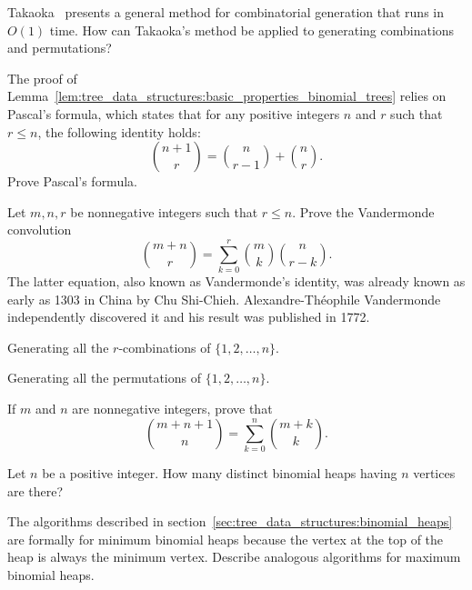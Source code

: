\begin{problem}
\item Takaoka~\cite{Takaoka1999b} presents a
  general method for combinatorial
  generation that runs in $O(1)$ time. How can Takaoka's method be
  applied to generating combinations and permutations?

\item The proof of
  Lemma~\ref{lem:tree_data_structures:basic_properties_binomial_trees}
  relies on Pascal's formula, which states that
  for any positive integers $n$ and $r$ such that $r \leq n$, the
  following identity holds:
  \[
  \binom{n+1}{r}
  =
  \binom{n}{r-1} + \binom{n}{r}.
  \]
  Prove Pascal's formula.

\item Let $m,n,r$ be nonnegative integers such that $r \leq n$. Prove
  the Vandermonde convolution
  \[
  \binom{m + n}{r}
  =
  \sum_{k=0}^r \binom{m}{k} \binom{n}{r-k}.
  \]
  The latter equation, also known as Vandermonde's identity, was
  already known as early as 1303 in China by Chu
  Shi-Chieh. Alexandre-Th\'eophile
  Vandermonde independently
  discovered it and his result was published in 1772.

\begin{algorithm}[!htbp]

\caption{Generating all the $r$-combinations of $\{1, 2, \dots, n\}$.}
\label{alg:tree_data_structures:generate_all_r_combinations}
\end{algorithm}

\begin{algorithm}[!htbp]

\caption{Generating all the permutations of $\{1, 2, \dots, n\}$.}
\label{alg:tree_data_structures:generate_all_permutations}
\end{algorithm}

\item If $m$ and $n$ are nonnegative integers, prove that
  \[
  \binom{m + n + 1}{n}
  =
  \sum_{k=0}^n \binom{m + k}{k}.
  \]

\item Let $n$ be a positive integer. How many distinct
  binomial heaps having $n$ vertices are there?

\item The algorithms described in
  section~\ref{sec:tree_data_structures:binomial_heaps} are formally
  for minimum binomial heaps because the
  vertex at the top of the heap is always the minimum vertex. Describe
  analogous algorithms for maximum
  binomial heaps.


\end{problem}
